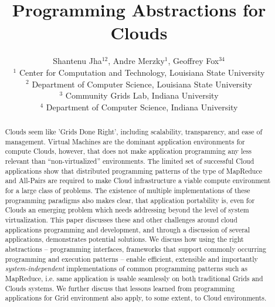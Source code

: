 \documentclass{article}
\begin{document}
\title{\large Programming Abstractions for Clouds}

\author{Shantenu Jha$^{12}$,
        Andre Merzky$^{1}$,
        Geoffrey Fox$^{34}$\\[1em]
        $^1$ \small
          Center for Computation and Technology, 
          Louisiana State University\\[-0.3em]
        $^2$ \small
          Department of Computer Science, 
          Louisiana State University\\[-0.3em]
        $^3$ \small
          Community Grids Lab, 
          Indiana University\\[-0.3em]
        $^4$ \small
          Department of Computer Science, 
          Indiana University
       }

\maketitle

\begin{abstract}

  \noindent

  Clouds seem like 'Grids Done Right', including scalability,
  transparency, and ease of management. Virtual Machines are the
  dominant application environments for compute Clouds, however, that
  does not make application programming any less relevant than
  ``non-virtualized'' environments.  The limited set of successful
  Cloud applications show that distributed programming patterns of the
  type of
  MapReduce and All-Pairs are
  required %
  to make Cloud infrastructure a viable compute environment for a
  large class of problems.  The existence of multiple implementations
  of these programming paradigms also makes clear, that application
  portability is, even for Clouds an emerging problem which needs
  addressing beyond the level of system virtualization. %
  This paper discusses these and other challenges around cloud
  applications programming and development, and through a discussion
  of several applications, demonstrates potential solutions. We
  discuss how using the right abstractions -- programming interfaces,
  frameworks that support commonly occurring programming and execution
  patterns -- enable efficient, extensible and importantly {\it
    system-independent} implementations of common programming patterns
  such as MapReduce, i.e. same application is usable seamlessly on both
  traditional Grids and Clouds systems. We further discuss that
  lessons learned from programming applications for Grid environment
  also apply, to some extent, to Cloud environments.

\end{abstract}
\end{document}
